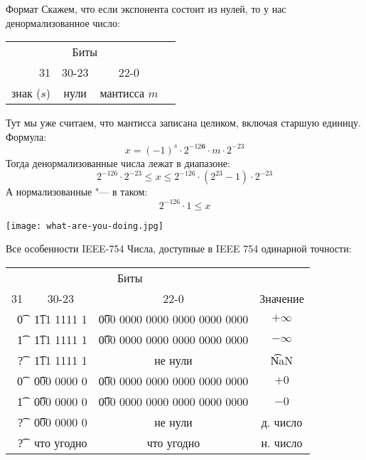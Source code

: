 \begin{frame}{Формат}
	Скажем, что если экспонента состоит из нулей, то у нас денормализованное число:
	\begin{center}
		\begin{tabular}{r|c|c|c}
			\multicolumn{3}{c}{Биты} \\
			31 & 30-23 & 22-0 \\\hline
			знак ($s$) & нули & мантисса $m$ \\
		\end{tabular}
	\end{center}
	Тут мы уже считаем, что мантисса записана целиком, включая старшую единицу.
	Формула:
	\[
		x = (-1)^s \cdot 2^{-12\textbf{6}} \cdot m \cdot 2^{-23}
	\]
	Тогда денормализованные числа лежат в диапазоне:
	\[
		2^{-126} \cdot 2^{-23} \le x \le 2^{-126} \cdot (2^{23}-1) \cdot2^{-23}
	\]
	А нормализованные "--- в таком:
	\[
		2^{-126} \cdot 1 \le x
	\]
\end{frame}

\begin{frame}
	\begin{center}
		\texttt{[image: what-are-you-doing.jpg]}
	\end{center}
\end{frame}

\begin{frame}{Все особенности IEEE-754}
	Числа, доступные в IEEE 754 одинарной точности:
	\begin{center}
		\begin{tabular}{r|c|c|c}
			\multicolumn{3}{c}{Биты} & \\
			31 & 30-23 & 22-0 & Значение \\\hline
			\t{0} & \t{111 1111 1} & \t{000 0000 0000 0000 0000 0000} & $+\infty $\\
			\t{1} & \t{111 1111 1} & \t{000 0000 0000 0000 0000 0000} & $-\infty $\\
			\t{?} & \t{111 1111 1} & не нули                          & \t{NaN} \\
			\t{0} & \t{000 0000 0} & \t{000 0000 0000 0000 0000 0000} & $+0$ \\
			\t{1} & \t{000 0000 0} & \t{000 0000 0000 0000 0000 0000} & $-0$ \\
			\t{?} & \t{000 0000 0} & не нули                          & д. число \\
			\t{?} & что угодно     & что угодно                       & н. число \\
		\end{tabular}
	\end{center}	
\end{frame}

